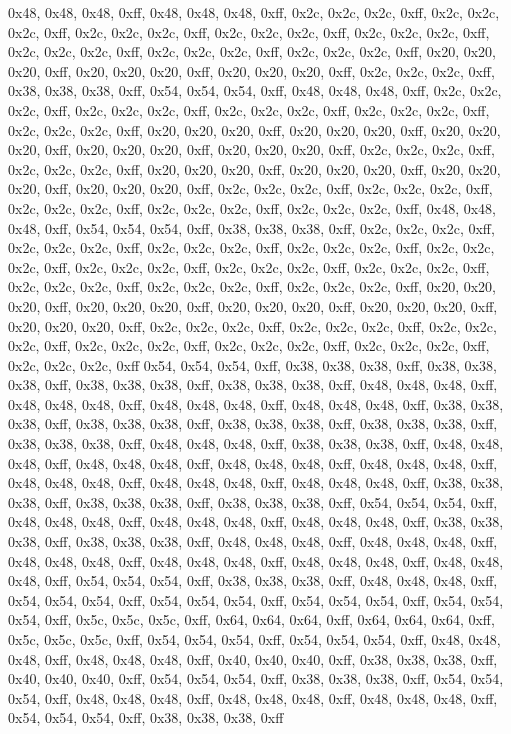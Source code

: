 0x48, 0x48, 0x48, 0xff, 0x48, 0x48, 0x48, 0xff, 0x2c, 0x2c, 0x2c, 0xff, 0x2c, 0x2c, 0x2c, 0xff, 0x2c, 0x2c, 0x2c, 0xff, 0x2c, 0x2c, 0x2c, 0xff, 0x2c, 0x2c, 0x2c, 0xff, 0x2c, 0x2c, 0x2c, 0xff, 0x2c, 0x2c, 0x2c, 0xff, 0x2c, 0x2c, 0x2c, 0xff, 0x20, 0x20, 0x20, 0xff, 0x20, 0x20, 0x20, 0xff, 0x20, 0x20, 0x20, 0xff, 0x2c, 0x2c, 0x2c, 0xff, 0x38, 0x38, 0x38, 0xff, 0x54, 0x54, 0x54, 0xff, 0x48, 0x48, 0x48, 0xff, 0x2c, 0x2c, 0x2c, 0xff, 0x2c, 0x2c, 0x2c, 0xff, 0x2c, 0x2c, 0x2c, 0xff, 0x2c, 0x2c, 0x2c, 0xff, 0x2c, 0x2c, 0x2c, 0xff, 0x20, 0x20, 0x20, 0xff, 0x20, 0x20, 0x20, 0xff, 0x20, 0x20, 0x20, 0xff, 0x20, 0x20, 0x20, 0xff, 0x20, 0x20, 0x20, 0xff, 0x2c, 0x2c, 0x2c, 0xff, 0x2c, 0x2c, 0x2c, 0xff, 0x20, 0x20, 0x20, 0xff, 0x20, 0x20, 0x20, 0xff, 0x20, 0x20, 0x20, 0xff, 0x20, 0x20, 0x20, 0xff, 0x2c, 0x2c, 0x2c, 0xff, 0x2c, 0x2c, 0x2c, 0xff, 0x2c, 0x2c, 0x2c, 0xff, 0x2c, 0x2c, 0x2c, 0xff, 0x2c, 0x2c, 0x2c, 0xff, 0x48, 0x48, 0x48, 0xff, 0x54, 0x54, 0x54, 0xff, 0x38, 0x38, 0x38, 0xff, 0x2c, 0x2c, 0x2c, 0xff, 0x2c, 0x2c, 0x2c, 0xff, 0x2c, 0x2c, 0x2c, 0xff, 0x2c, 0x2c, 0x2c, 0xff, 0x2c, 0x2c, 0x2c, 0xff, 0x2c, 0x2c, 0x2c, 0xff, 0x2c, 0x2c, 0x2c, 0xff, 0x2c, 0x2c, 0x2c, 0xff, 0x2c, 0x2c, 0x2c, 0xff, 0x2c, 0x2c, 0x2c, 0xff, 0x2c, 0x2c, 0x2c, 0xff, 0x20, 0x20, 0x20, 0xff, 0x20, 0x20, 0x20, 0xff, 0x20, 0x20, 0x20, 0xff, 0x20, 0x20, 0x20, 0xff, 0x20, 0x20, 0x20, 0xff, 0x2c, 0x2c, 0x2c, 0xff, 0x2c, 0x2c, 0x2c, 0xff, 0x2c, 0x2c, 0x2c, 0xff, 0x2c, 0x2c, 0x2c, 0xff, 0x2c, 0x2c, 0x2c, 0xff, 0x2c, 0x2c, 0x2c, 0xff, 0x2c, 0x2c, 0x2c, 0xff
0x54, 0x54, 0x54, 0xff, 0x38, 0x38, 0x38, 0xff, 0x38, 0x38, 0x38, 0xff, 0x38, 0x38, 0x38, 0xff, 0x38, 0x38, 0x38, 0xff, 0x48, 0x48, 0x48, 0xff, 0x48, 0x48, 0x48, 0xff, 0x48, 0x48, 0x48, 0xff, 0x48, 0x48, 0x48, 0xff, 0x38, 0x38, 0x38, 0xff, 0x38, 0x38, 0x38, 0xff, 0x38, 0x38, 0x38, 0xff, 0x38, 0x38, 0x38, 0xff, 0x38, 0x38, 0x38, 0xff, 0x48, 0x48, 0x48, 0xff, 0x38, 0x38, 0x38, 0xff, 0x48, 0x48, 0x48, 0xff, 0x48, 0x48, 0x48, 0xff, 0x48, 0x48, 0x48, 0xff, 0x48, 0x48, 0x48, 0xff, 0x48, 0x48, 0x48, 0xff, 0x48, 0x48, 0x48, 0xff, 0x48, 0x48, 0x48, 0xff, 0x38, 0x38, 0x38, 0xff, 0x38, 0x38, 0x38, 0xff, 0x38, 0x38, 0x38, 0xff, 0x54, 0x54, 0x54, 0xff, 0x48, 0x48, 0x48, 0xff, 0x48, 0x48, 0x48, 0xff, 0x48, 0x48, 0x48, 0xff, 0x38, 0x38, 0x38, 0xff, 0x38, 0x38, 0x38, 0xff, 0x48, 0x48, 0x48, 0xff, 0x48, 0x48, 0x48, 0xff, 0x48, 0x48, 0x48, 0xff, 0x48, 0x48, 0x48, 0xff, 0x48, 0x48, 0x48, 0xff, 0x48, 0x48, 0x48, 0xff, 0x54, 0x54, 0x54, 0xff, 0x38, 0x38, 0x38, 0xff, 0x48, 0x48, 0x48, 0xff, 0x54, 0x54, 0x54, 0xff, 0x54, 0x54, 0x54, 0xff, 0x54, 0x54, 0x54, 0xff, 0x54, 0x54, 0x54, 0xff, 0x5c, 0x5c, 0x5c, 0xff, 0x64, 0x64, 0x64, 0xff, 0x64, 0x64, 0x64, 0xff, 0x5c, 0x5c, 0x5c, 0xff, 0x54, 0x54, 0x54, 0xff, 0x54, 0x54, 0x54, 0xff, 0x48, 0x48, 0x48, 0xff, 0x48, 0x48, 0x48, 0xff, 0x40, 0x40, 0x40, 0xff, 0x38, 0x38, 0x38, 0xff, 0x40, 0x40, 0x40, 0xff, 0x54, 0x54, 0x54, 0xff, 0x38, 0x38, 0x38, 0xff, 0x54, 0x54, 0x54, 0xff, 0x48, 0x48, 0x48, 0xff, 0x48, 0x48, 0x48, 0xff, 0x48, 0x48, 0x48, 0xff, 0x54, 0x54, 0x54, 0xff, 0x38, 0x38, 0x38, 0xff
